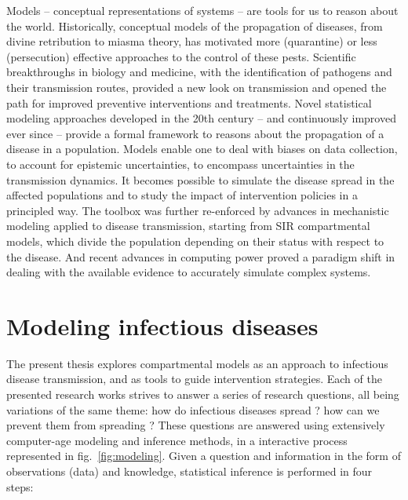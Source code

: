 Models -- conceptual representations of systems -- are tools for us to reason about the world. Historically, conceptual models of the propagation of diseases, from divine retribution to miasma theory, has motivated more (quarantine) or less (persecution) effective approaches to the control of these pests. Scientific breakthroughs in biology and medicine, with the identification of pathogens and their transmission routes, provided a new look on transmission and opened the path for improved preventive interventions and treatments. Novel statistical modeling approaches\cite[-3\baselineskip]{Freedman:AssociationCausationRemarks:1999} developed in the 20th century -- and continuously improved ever since\cite{Gelman:WhatAreMost:2021} --  provide a formal framework to reasons about the propagation of a disease in a population. Models enable one to deal with biases on data collection, to account for epistemic uncertainties, to encompass uncertainties in the transmission dynamics. It becomes possible to simulate the disease spread in the affected populations and to study the impact of intervention policies in a principled way. The toolbox was further re-enforced by advances in mechanistic modeling applied to disease transmission, starting from SIR compartmental models\cite{Kermack:ContributionMathematicalTheory:1927, Anderson:PopulationBiologyInfectious:1979}, which divide the population depending on their status with respect to the disease. And recent advances in computing power proved a paradigm shift in dealing with the available evidence to accurately simulate complex systems.



\section{Modeling infectious diseases}
The present thesis explores compartmental models as an approach to infectious disease transmission, and as tools to guide intervention strategies. Each of the presented research works strives to answer a series of research questions, all being variations of the same theme: how do infectious diseases spread ? how can we prevent them from spreading ? These questions are answered using extensively computer-age modeling and inference methods, in a interactive process represented in fig.~\ref{fig:modeling}. Given a question and information in the form of observations (data) and knowledge, statistical inference is performed in four steps:

